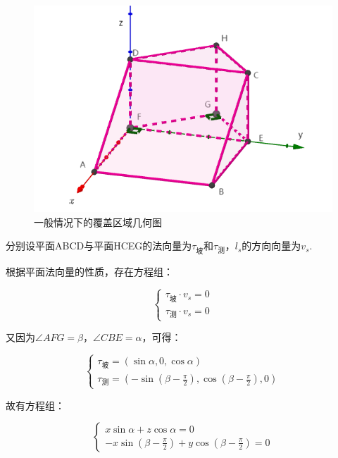 \begin{figure}[h]
    \centering
    \includegraphics[scale=0.4]{res/img/一般情况下的覆盖区域几何图.png}
    \caption{一般情况下的覆盖区域几何图}
    \label{fig:一般情况下的覆盖区域几何图}
\end{figure}

分别设平面ABCD与平面HCEG的法向量为$\tau_\text{坡}$和$\tau_\text{测}$，$l_s$的方向向量为$v_s$.

根据平面法向量的性质，存在方程组：

\begin{equation}
    \begin{cases}
        \tau_\text{坡} \cdot v_s = 0 \\
        \tau_\text{测} \cdot v_s = 0
    \end{cases}
\end{equation}

又因为$\angle AFG=\beta$，$\angle CBE=\alpha$，可得：

\begin{equation}
    \begin{cases}
        \tau_\text{坡} = (\sin\alpha, 0, \cos\alpha) \\
        \tau_\text{测} = (-\sin(\beta-\frac{\pi}{2}), \cos(\beta-\frac{\pi}{2}), 0)
    \end{cases}
\end{equation}

故有方程组：

\begin{equation}
    \begin{cases}
        x\sin\alpha + z\cos\alpha = 0 \\
        -x\sin(\beta-\frac{\pi}{2}) + y \cos(\beta-\frac{\pi}{2}) = 0
    \end{cases}
\end{equation}

